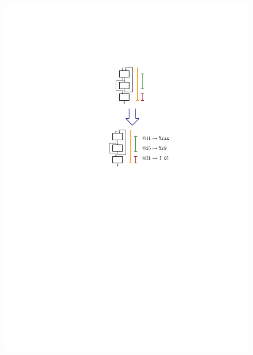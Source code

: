 \documentclass[navbaroff,en]{sdqbeamer}
\begin{document}
\begin{frame}
\begin{columns}
	\begin{column}{0.3\textwidth}
		\centering \includegraphics[scale=0.7]{images/allocation.pdf}
	\end{column}
\end{columns}
\end{frame}
\end{document}
